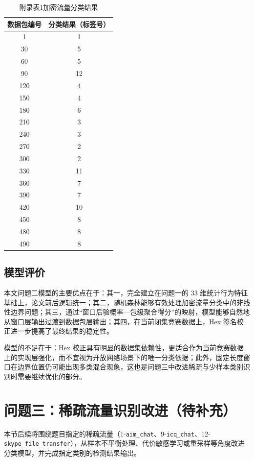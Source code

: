 \documentclass[UTF8,a4paper,12pt]{ctexart}
\begin{document}
\begin{table}[H]
    \centering
    \caption{附录表1\quad 加密流量分类结果}
    \begin{tabular}{cc}
        \toprule
        数据包编号 & 分类结果（标签号）\\
        \midrule
        1   & 1  \\
        30  & 5  \\
        60  & 5  \\
        90  & 12 \\
        120 & 4  \\
        150 & 4  \\
        180 & 6  \\
        210 & 3  \\
        240 & 3  \\
        270 & 2  \\
        300 & 2  \\
        330 & 11 \\
        360 & 7  \\
        390 & 7  \\
        420 & 10 \\
        450 & 8  \\
        480 & 8  \\
        490 & 8  \\
        \bottomrule
    \end{tabular}
\end{table}

\subsection{模型评价}

本文问题二模型的主要优点在于：其一，完全建立在问题一的 33 维统计行为特征基础上，论文前后逻辑统一；其二，随机森林能够有效处理加密流量分类中的非线性边界问题；其三，通过“窗口后验概率—包级聚合得分”的映射，模型能够自然地从窗口层输出过渡到数据包层输出；其四，在当前闭集竞赛数据上，Hex 签名校正进一步提高了最终结果的稳定性。

模型的不足在于：Hex 校正具有明显的数据集依赖性，更适合作为当前竞赛数据上的实现层强化，而不宜视为开放网络场景下的唯一分类依据；此外，固定长度窗口在边界位置仍可能出现多类混合现象，这也是问题三中改进稀疏与少样本类别识别时需要继续优化的部分。

\section{问题三：稀疏流量识别改进（待补充）}
本节后续将围绕题目指定的稀疏流量（1-\texttt{aim\_chat}、9-\texttt{icq\_chat}、12-\texttt{skype\_file\_transfer}），从样本不平衡处理、代价敏感学习或重采样等角度改进分类模型，并完成指定类别的检测结果输出。
\end{document}
